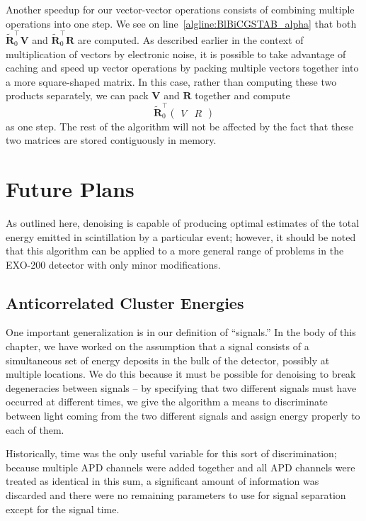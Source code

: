 Another speedup for our vector-vector operations consists of combining multiple operations into one step.  We see on line~\ref{algline:BlBiCGSTAB_alpha} that both $\mathbf{\widetilde{R}}_0^\top \mathbf{V}$ and $\mathbf{\widetilde{R}}_0^\top \mathbf{R}$ are computed.  As described earlier in the context of multiplication of vectors by electronic noise, it is possible to take advantage of caching and speed up vector operations by packing multiple vectors together into a more square-shaped matrix.  In this case, rather than computing these two products separately, we can pack $\mathbf{V}$ and $\mathbf{R}$ together and compute
\[\mathbf{\widetilde{R}}_0^\top \begin{pmatrix} V & R \end{pmatrix}\]
as one step.  The rest of the algorithm will not be affected by the fact that these two matrices are stored contiguously in memory.

\section{Future Plans}

As outlined here, denoising is capable of producing optimal estimates of the total energy emitted in scintillation by a particular event; however, it should be noted that this algorithm can be applied to a more general range of problems in the EXO-200 detector with only minor modifications.

\subsection{Anticorrelated Cluster Energies}

One important generalization is in our definition of ``signals.''  In the body of this chapter, we have worked on the assumption that a signal consists of a simultaneous set of energy deposits in the bulk of the detector, possibly at multiple locations.  We do this because it must be possible for denoising to break degeneracies between signals -- by specifying that two different signals must have occurred at different times, we give the algorithm a means to discriminate between light coming from the two different signals and assign energy properly to each of them.

Historically, time was the only useful variable for this sort of discrimination; because multiple APD channels were added together and all APD channels were treated as identical in this sum, a significant amount of information was discarded and there were no remaining parameters to use for signal separation except for the signal time.

